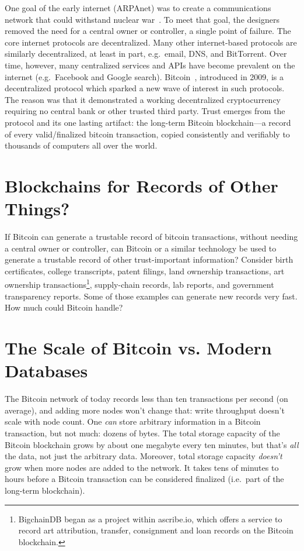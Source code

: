 \documentclass[a4paper]{article}
\begin{document}
One goal of the early internet (ARPAnet) was to create a communications network
that could withstand nuclear war~\cite{arpanet_and_nuclear_war}.
To meet that goal, the designers removed the need for a central owner or
controller, a single point of failure.
The core internet protocols are decentralized.
Many other internet-based protocols are similarly decentralized,
at least in part, e.g.~email, DNS, and BitTorrent.
Over time, however, many centralized services and APIs have become
prevalent on the internet (e.g.~Facebook and Google search).
Bitcoin~\cite{nakamoto2009bitcoin}, introduced in 2009,
is a decentralized protocol
which sparked a new wave of interest in such protocols.
The reason was that it demonstrated a working decentralized cryptocurrency
requiring no central bank or other trusted third party.
Trust emerges from the protocol and its one lasting artifact:
the long-term Bitcoin blockchain---a record
of every valid/finalized bitcoin transaction,
copied consistently and verifiably to thousands
of computers all over the world.


\section{Blockchains for Records of Other Things?}

If Bitcoin can generate a trustable record of bitcoin transactions,
without needing a central owner or controller,
can Bitcoin or a similar technology be used
to generate a trustable record of other trust-important information?
Consider
birth certificates,
college transcripts,
patent filings,
land ownership transactions,
art ownership transactions\footnote{BigchainDB
began as a project within ascribe.io,
which offers a service to record art attribution, transfer,
consignment and loan records on the Bitcoin blockchain.},
supply-chain records,
lab reports,
and
government transparency reports.
Some of those examples can
generate new records very fast.
How much could Bitcoin handle?


\section{The Scale of Bitcoin vs. Modern Databases}

The Bitcoin network of today records less than ten transactions per second (on average),
and adding more nodes won't change that: write throughput doesn't scale with node count.
One \emph{can} store arbitrary information in a Bitcoin transaction,
but not much: dozens of bytes.
The total storage capacity of the Bitcoin blockchain grows
by about one megabyte every ten minutes, but that's \emph{all} the data,
not just the arbitrary data.
Moreover, total storage capacity \emph{doesn't} grow when more nodes are added to the network.
It takes tens of minutes to hours before a Bitcoin transaction can be considered finalized
(i.e.~part of the long-term blockchain).
\end{document}
